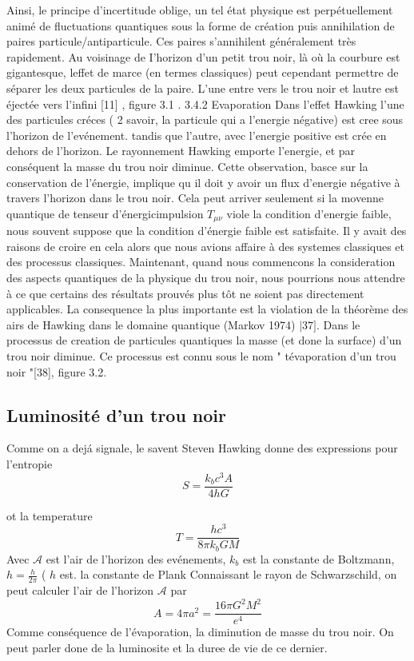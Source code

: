 \documentclass[12pt,  a4paper, openright]{report} %
\begin{document}
Ainsi, le principe d'incertitude oblige, un tel état physique est perpétuellement animé de fluctuations quantiques sous la forme de création puis annihilation de paires particule/antiparticule. Ces paires s'annihilent généralement très rapidement. Au voisinage de I'horizon d'un petit trou noir, là où la courbure est gigantesque, leffet de marce (en termes classiques) peut cependant permettre de séparer les deux particules de la paire. L'une entre vers le trou noir et lautre est éjectée vers l'infini [11] , figure 3.1 .
3.4.2 Evaporation
Dans l'effet Hawking l'une des particules créces ( 2 savoir, la particule qui a l'energie négative) est cree sous l'horizon de l'evénement. tandis que l'autre, avec l'energie positive est crée en dehors de l'horizon. Le rayonnement Hawking emporte l'energie, et par conséquent la masse du trou noir diminue. Cette observation, basce sur la conservation de l'énergie, implique qu il doit y avoir un flux d'energie négative à travers l'horizon dans le trou noir. Cela peut arriver seulement si la movenne quantique de tenseur d'énergicimpulsion $T_{\mu \nu}$ viole la condition d'energie faible, nous souvent suppose que la condition d'énergie faible est satisfaite. Il y avait des raisons de croire en cela alors que nous avions affaire à des systemes classiques et des processus classiques. Maintenant, quand nous commencons la consideration des aspects quantiques de la physique du trou noir, nous pourrions nous attendre à ce que certains des résultats prouvés plus tôt ne soient pas directement applicables. La consequence la plus importante est la violation de la théorème des airs de Hawking dans le domaine quantique (Markov 1974) $\mid 37]$. Dans le processus de creation de particules quantiques la masse (et done la surface) d'un trou noir diminue. Ce processus est connu sous le nom " tévaporation d'un trou noir "[38], figure 3.2.
\subsection {Luminosité d'un trou noir}
Comme on a dejá signale, le savent Steven Hawking donne des expressions pour l'entropie
$$
S=\frac{k_{b} c^{3} A}{4 h G}
$$

ot la temperature
$$
T=\frac{h c^{3}}{8 \pi k_{b} G M}
$$
Avec $\mathcal{A}$ est l'air de l'horizon des evénements, $k_{b}$ est la constante de Boltzmann, $h=\frac{h}{2 \pi}$ ( $h$ est. la constante de Plank Connaissant le rayon de Schwarzschild, on peut calculer l'air de l'horizon $\mathcal{A}$ par
$$
A=4 \pi a^{2}=\frac{16 \pi G^{2} M^{2}}{e^{4}}
$$
Comme conséquence de l'évaporation, la diminution de masse du trou noir. On peut parler done de la luminosite et la duree de vie de ce dernier.
\end{document}
